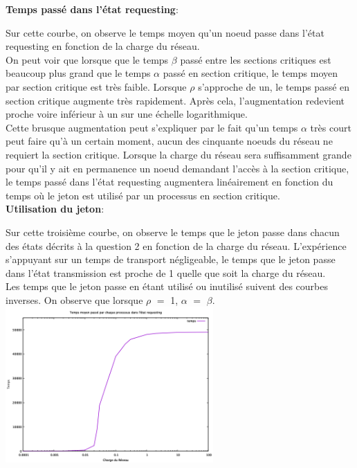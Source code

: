 \documentclass[11pt,a4paper]{report}
\begin{document}
\textbf{Temps passé dans l'état requesting}:

Sur cette courbe, on observe le temps moyen qu'un noeud passe dans l'état requesting en fonction de la charge du réseau.\\

On peut voir que lorsque que le temps $\beta$ passé entre les sections critiques est beaucoup plus grand que le temps $\alpha$ passé en section critique, le temps moyen par section critique est très faible. Lorsque $\rho$ s'approche de un, le temps passé en section critique augmente très rapidement. Après cela, l'augmentation redevient proche voire inférieur à un sur une échelle logarithmique.\\

Cette brusque augmentation peut s'expliquer par le fait qu'un temps $\alpha$ très court peut faire qu'à un certain moment, aucun des cinquante noeuds du réseau ne requiert la section critique. Lorsque la charge du réseau sera suffisamment grande pour qu'il y ait en permanence un noeud demandant l'accès à la section critique, le temps passé dans l'état requesting augmentera linéairement en fonction du temps où le jeton est utilisé par un processus en section critique.\\

\textbf{Utilisation du jeton}:

Sur cette troisième courbe, on observe le temps que le jeton passe dans chacun des états décrits à la question 2 en fonction de la charge du réseau. L'expérience s'appuyant sur un temps de transport négligeable, le temps que le jeton passe dans l'état transmission est proche de 1 quelle que soit la charge du réseau.\\

Les temps que le jeton passe en étant utilisé ou inutilisé suivent des courbes inverses. On observe que lorsque $\rho$ $=$ 1, $\alpha$ $=$ $\beta$.\\


\includegraphics[width=300]{Temps_etat_requesting.png}
\end{document}
